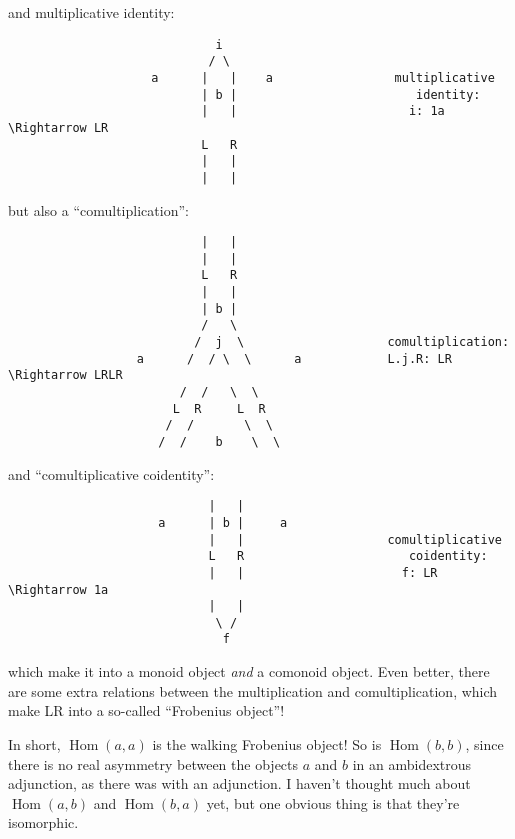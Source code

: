 \documentclass{article}
\begin{document}
and multiplicative identity:

\begin{verbatim}
                             i
                            / \
                    a      |   |    a                 multiplicative
                           | b |                         identity:
                           |   |                        i: 1a \Rightarrow LR
                           L   R   
                           |   |
                           |   |
\end{verbatim}

but also a ``comultiplication'':

\begin{verbatim}
                           |   |
                           |   |   
                           L   R
                           |   |
                           | b |
                           /   \                           
                          /  j  \                    comultiplication:
                  a      /  / \  \      a            L.j.R: LR \Rightarrow LRLR
                        /  /   \  \
                       L  R     L  R
                      /  /       \  \
                     /  /    b    \  \ 
\end{verbatim}

and ``comultiplicative coidentity'':

\begin{verbatim}
                            |   |    
                     a      | b |     a 
                            |   |                    comultiplicative
                            L   R                       coidentity:
                            |   |                      f: LR \Rightarrow 1a
                            |   |
                             \ /
                              f
\end{verbatim}

which make it into a monoid object \emph{and} a comonoid object. Even
better, there are some extra relations between the multiplication and
comultiplication, which make LR into a so-called ``Frobenius object''!

In short, \(\operatorname{Hom}(a,a)\) is the walking Frobenius object!
So is \(\operatorname{Hom}(b,b)\), since there is no real asymmetry
between the objects \(a\) and \(b\) in an ambidextrous adjunction, as
there was with an adjunction. I haven't thought much about
\(\operatorname{Hom}(a,b)\) and \(\operatorname{Hom}(b,a)\) yet, but one
obvious thing is that they're isomorphic.
\end{document}
